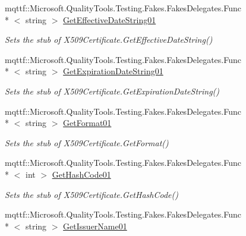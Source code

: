 \begin{DoxyCompactItemize}
mqttf\-::\-Microsoft.\-Quality\-Tools.\-Testing.\-Fakes.\-Fakes\-Delegates.\-Func\\*
$<$ string $>$ \hyperlink{class_system_1_1_security_1_1_cryptography_1_1_x509_certificates_1_1_fakes_1_1_stub_x509_certificate2_aaa8ba86d95e4d7d0c94bb4ea88fb3247}{Get\-Effective\-Date\-String01}
\begin{DoxyCompactList}\small\item\em Sets the stub of X509\-Certificate.\-Get\-Effective\-Date\-String()\end{DoxyCompactList}\item 
mqttf\-::\-Microsoft.\-Quality\-Tools.\-Testing.\-Fakes.\-Fakes\-Delegates.\-Func\\*
$<$ string $>$ \hyperlink{class_system_1_1_security_1_1_cryptography_1_1_x509_certificates_1_1_fakes_1_1_stub_x509_certificate2_a024c4c486b5ff619ac73da8cb8f77884}{Get\-Expiration\-Date\-String01}
\begin{DoxyCompactList}\small\item\em Sets the stub of X509\-Certificate.\-Get\-Expiration\-Date\-String()\end{DoxyCompactList}\item 
mqttf\-::\-Microsoft.\-Quality\-Tools.\-Testing.\-Fakes.\-Fakes\-Delegates.\-Func\\*
$<$ string $>$ \hyperlink{class_system_1_1_security_1_1_cryptography_1_1_x509_certificates_1_1_fakes_1_1_stub_x509_certificate2_af0b7ae8b3206626de97ec8503c1d6557}{Get\-Format01}
\begin{DoxyCompactList}\small\item\em Sets the stub of X509\-Certificate.\-Get\-Format()\end{DoxyCompactList}\item 
mqttf\-::\-Microsoft.\-Quality\-Tools.\-Testing.\-Fakes.\-Fakes\-Delegates.\-Func\\*
$<$ int $>$ \hyperlink{class_system_1_1_security_1_1_cryptography_1_1_x509_certificates_1_1_fakes_1_1_stub_x509_certificate2_a5e3470ff2cb524f928b25aac3cecc2c2}{Get\-Hash\-Code01}
\begin{DoxyCompactList}\small\item\em Sets the stub of X509\-Certificate.\-Get\-Hash\-Code()\end{DoxyCompactList}\item 
mqttf\-::\-Microsoft.\-Quality\-Tools.\-Testing.\-Fakes.\-Fakes\-Delegates.\-Func\\*
$<$ string $>$ \hyperlink{class_system_1_1_security_1_1_cryptography_1_1_x509_certificates_1_1_fakes_1_1_stub_x509_certificate2_ae55ad680393b306028833c8c771b1bad}{Get\-Issuer\-Name01}

\end{DoxyCompactItemize}
